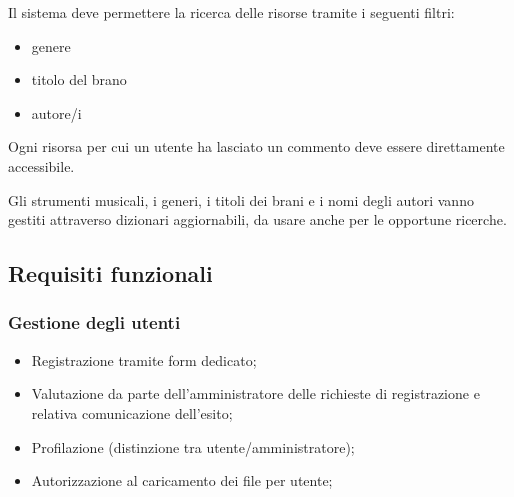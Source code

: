 \documentclass[a4paper]{article}
\begin{document}
Il sistema deve permettere la ricerca delle risorse tramite i seguenti filtri:
\begin{itemize}
    \item genere
    \item titolo del brano
    \item autore/i
\end{itemize}

Ogni risorsa per cui un utente ha lasciato un commento deve essere direttamente accessibile.

Gli strumenti musicali, i generi, i titoli dei brani e i nomi degli autori vanno gestiti attraverso dizionari aggiornabili, da usare anche per le opportune ricerche.

\subsection{Requisiti funzionali}

\subsubsection{Gestione degli utenti}
\begin{itemize}
    \item Registrazione tramite form dedicato;
    \item Valutazione da parte dell’amministratore delle richieste di registrazione e relativa comunicazione dell’esito;
    \item Profilazione (distinzione tra utente/amministratore);
    \item Autorizzazione al caricamento dei file per utente;
\end{itemize}
\end{document}
